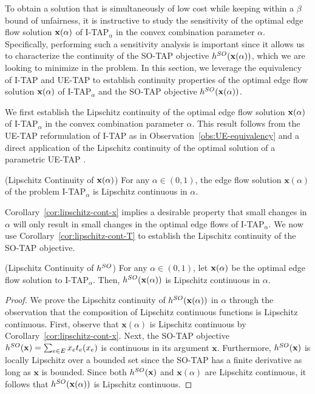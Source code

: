 \documentclass{article}
\begin{document}
To obtain a solution that is simultaneously of low cost while keeping within a $\beta$ bound of unfairness, it is instructive to study the sensitivity of the optimal edge flow solution $\mathbf{x}(\alpha)$ of I-TAP$_{\alpha}$ in the convex combination parameter $\alpha$. Specifically, performing such a sensitivity analysis is important since it allows us to characterize the continuity of the SO-TAP objective $h^{SO}(\mathbf{x}(\alpha))$, which we are looking to minimize in the \fso problem. In this section, we leverage the equivalency of I-TAP and UE-TAP to establish continuity properties of the optimal edge flow solution $\mathbf{x}(\alpha)$ of I-TAP$_{\alpha}$ and the SO-TAP objective $h^{SO}(\mathbf{x}(\alpha))$.

We first establish the Lipschitz continuity of the optimal edge flow solution $\mathbf{x}(\alpha)$ of I-TAP$_{\alpha}$ in the convex combination parameter
$\alpha$. This result follows from the UE-TAP reformulation of I-TAP as in Observation~\ref{obs:UE-equivalency} and a direct application of the Lipschitz continuity of the optimal solution of a parametric UE-TAP \cite[Theorem 8.6a]{parametric-still}.

\begin{corollary} (Lipschitz Continuity of $\mathbf{x}(\alpha)$) \label{cor:lipschitz-cont-x}
For any $\alpha \in (0, 1)$, the edge flow solution $\mathbf{x}(\alpha)$ of the problem I-TAP$_{\alpha}$ is Lipschitz continuous in $\alpha$.
\end{corollary}
Corollary~\ref{cor:lipschitz-cont-x} implies a desirable property that small changes in $\alpha$ will only result in small changes in the optimal edge flows of I-TAP$_{\alpha}$. We now use Corollary~\ref{cor:lipschitz-cont-T} to establish the Lipschitz continuity of the SO-TAP objective.

\begin{corollary} (Lipschitz Continuity of $h^{SO}$) \label{cor:lipschitz-cont-T}
For any $\alpha \in (0, 1)$, let $\mathbf{x}(\alpha)$ be the optimal edge flow solution to I-TAP$_{\alpha}$. Then, %
$h^{SO}(\mathbf{x}(\alpha))$ is Lipschitz continuous in $\alpha$.%
\end{corollary}

\begin{proof}
We prove the Lipschitz continuity of $h^{SO}(\mathbf{x}(\alpha))$ in $\alpha$ through the observation that the composition of Lipschitz continuous functions is Lipschitz continuous. First, observe that $\mathbf{x}(\alpha)$ is Lipschitz continuous by Corollary~\ref{cor:lipschitz-cont-x}. Next, the SO-TAP objective $h^{SO}(\mathbf{x}) = \sum_{e \in E} x_e t_e(x_e)$ is %
continuous in its argument $\mathbf{x}$. Furthermore, $h^{SO}(\mathbf{x})$ is locally Lipschitz over a bounded set since the SO-TAP has a finite derivative as long as $\mathbf{x}$ is bounded. Since both $h^{SO}(\mathbf{x})$ and $\mathbf{x}(\alpha)$ are Lipschitz continuous, it follows that $h^{SO}(\mathbf{x}(\alpha))$ is Lipschitz continuous.
\end{proof}
\end{document}
